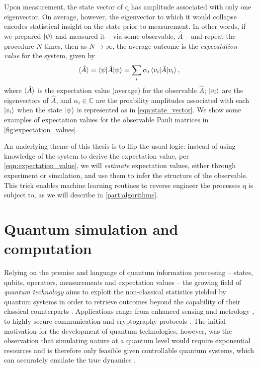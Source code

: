 Upon measurement, the state vector of \gls{q} has amplitude associated with only one eigenvector. 
On average, however, the eigenvector to which it would collapse encodes statistical insight on the 
    state prior to measurement. 
In other words, if we prepared $\ket{\psi}$ and measured it -- via some observable, $\hat{A}$ -- 
    and repeat the procedure $N$ times, 
    then as $N \rightarrow \infty$, the average outcome is the \emph{expecatation value}
    for the system, given by 
\begin{equation}
    \label{eqn:expectation_value}
    \braket{\hat{A}} = \braket{\psi | \hat{A} | \psi} = \sum\limits_{i} \alpha_i \braket{v_i | \hat{A} | v_i},  
\end{equation}
    where $\braket{\hat{A}}$ is the \gls{expectation value} (average) for the observable $\hat{A}$; 
    $\ket{v_i}$ are the eigenvectors of $\hat{A}$, and $\alpha_i \in \mathbb{C}$ are the proability amplitudes
    associated with each $\ket{v_i}$ when the state $\ket{\psi}$ is represented as in \cref{eqn:state_vector}.
We show some examples of \glspl{expectation value} for the observable Pauli matrices in \cref{fig:expectation_values}. 
\par 

An underlying theme of this thesis is to flip the usual logic: 
    instead of using knowledge of the system to derive the \gls{expectation value}, per \cref{eqn:expectation_value},
    we will \emph{estimate} \glspl{expectation value}, either through experiment or simulation, 
    and use them to infer the structure of the observable.
This trick enables machine learning routines to reverse engineer 
    the processes \gls{q} is subject to, as we will describe in \cref{part:algorithms}. 


\section{Quantum simulation and computation}

Relying on the premise and language of quantum information processing 
    -- states, qubits, operators, measurements and expectation values -- 
    the growing field of \emph{quantum technology} aims to exploit the 
    non-classical statistics yielded by quantum systems in order to retrieve 
    outcomes beyond the capability of their classical counterparts \cite{dowling2003quantum}. 
Applications range from enhanced sensing and metrology \cite{giovannetti2004quantum, giovannetti2011advances}, 
    to highly-secure communication and cryptography protocols \cite{bennett2020quantum, ekert1991quantum, gisin2002quantum}.
The initial motivation for the development of quantum technologies, however, 
    was the  observation that simulating nature at a quantum level would require 
    exponential resources and is therefore only feasible given controllable quantum systems,
    which can accurately emulate the true dynamics \cite{manin1980vychislimoe, benioff1980computer, benioff1982quantum, feynman1982simulating}. 

